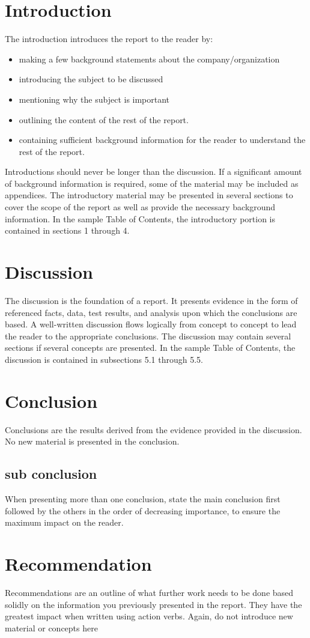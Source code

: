 \section{Introduction}
The introduction introduces the report to the reader by:
\begin{itemize}
	\item making a few background statements about the company/organization
	\item introducing the subject to be discussed
	\item mentioning why the subject is important
	\item outlining the content of the rest of the report.
	\item containing sufficient background information for the reader to understand the rest of the
report.
\end{itemize}
Introductions should never be longer than the discussion. If a significant amount of background information is required, some of the material may be included as appendices.
The introductory material may be presented in several sections to cover the scope of the report as well as provide the necessary background information. In the sample Table of Contents, the introductory portion is contained in sections 1 through 4.

\section{Discussion}
The discussion is the foundation of a report. It presents evidence in the form of referenced facts, data, test results, and analysis upon which the conclusions are based. A well-written discussion flows logically from concept to concept to lead the reader to the appropriate conclusions.
The discussion may contain several sections if several concepts are presented. In the sample Table of Contents, the discussion is contained in subsections 5.1 through 5.5.

\section{Conclusion}
Conclusions are the results derived from the evidence provided in the discussion. No new material is presented in the conclusion.
\subsection{sub conclusion}
When presenting more than one conclusion, state the main conclusion first followed by the others in the order of decreasing importance, to ensure the maximum impact on the reader.

\section{Recommendation}
Recommendations are an outline of what further work needs to be done based solidly on the information you previously presented in the report\cite{einstein}. They have the greatest impact when written using action verbs. Again, do not introduce new material or concepts here\cite{knuth-fa, knuthwebsite}
